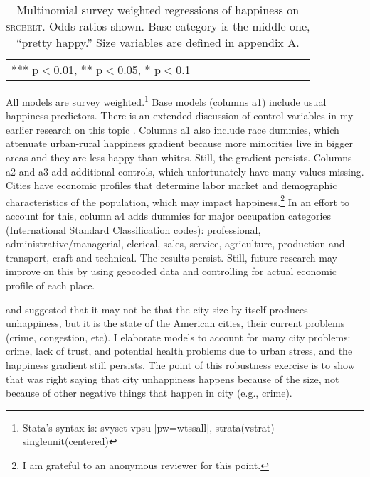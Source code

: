 \documentclass[12pt, letterpaper]{article}
\begin{document}
\begin{spacing}{1.9}
\begin{table}[h!]\centering
\caption{Multinomial survey weighted regressions of happiness on
  \textsc{srcbelt}. Odds ratios shown.  Base category is the middle one,
  ``pretty happy.'' Size variables are defined
in appendix A.} \label{reg_srcbelt}
\begin{scriptsize} \begin{tabular}{p{2in}p{.55in}p{.55in}p{.55in}p{.55in}p{.55in}p{.55in}p{.55in}p{.55in}p{.55in}p{.55 in}}\hline

\hline  *** p$<$0.01, ** p$<$0.05, * p$<$0.1
\end{tabular}\end{scriptsize}\end{table}

All models are survey weighted.\footnote{Stata's syntax is: svyset vpsu
  [pw=wtssall], strata(vstrat) singleunit(centered)} Base models (columns a1) include usual happiness predictors. There is an extended discussion of control variables in my earlier research on this topic \citep{aok11a,aokcities}. 
 Columns a1 also include race dummies, which attenuate urban-rural happiness gradient because more
minorities live in bigger areas and they are less happy than
whites. Still, the gradient persists. Columns a2 and a3 add additional controls,
which unfortunately have many values missing. 
Cities have economic profiles that determine labor market and demographic
characteristics of the population, which may impact happiness.\footnote{I am
  grateful to an anonymous reviewer for this point.} In an effort to
account for this, column a4 adds  dummies for major occupation categories
(International Standard Classification codes): professional,
administrative/managerial, clerical, sales, service, agriculture, production and
transport, craft and technical. The results persist. 
Still, future research may improve on this by using geocoded data and controlling for actual economic profile of each place.

\citet{fischer73} and \citet{campbell76etal} suggested that it may not be  that the city size
 by itself produces unhappiness, but it is the state of the
American cities,  their current problems (crime, congestion, etc). 
I elaborate models to account for many city problems: crime, lack of
trust, and potential health problems due to urban stress, and the
happiness gradient still persists. The  point of this robustness exercise is to show that 
\citet{wirth38} was right saying that city unhappiness happens because of the
size, not because of other negative things that happen in city (e.g., crime). 


\end{spacing}
\end{document}
